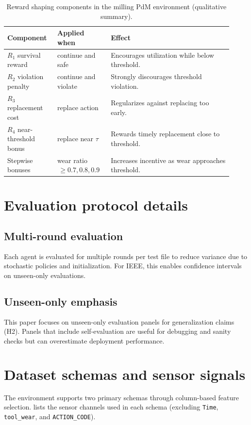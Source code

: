 \documentclass[11pt]{article}
\begin{document}
\begin{table}[t]
	\centering
	\caption{Reward shaping components in the milling PdM environment (qualitative summary).}
	\label{tab:reward_components}
	\begin{tabular}{p{0.20\linewidth} p{0.22\linewidth} p{0.50\linewidth}}
		\toprule
		\rowcolor{gray!20} \textbf{Component} & \textbf{Applied when} & \textbf{Effect}\\
		\midrule
		$R_1$ survival reward & continue and safe & Encourages utilization while below threshold.\\
		$R_2$ violation penalty & continue and violate & Strongly discourages threshold violation.\\
		$R_3$ replacement cost & replace action & Regularizes against replacing too early.\\
		$R_4$ near-threshold bonus & replace near $\tau$ & Rewards timely replacement close to threshold.\\
		Stepwise bonuses & wear ratio $\,\ge 0.7, 0.8, 0.9$ & Increases incentive as wear approaches threshold.\\
		\bottomrule
	\end{tabular}
\end{table}

\section{Evaluation protocol details}
\label{app:eval}
\subsection{Multi-round evaluation}
Each agent is evaluated for multiple rounds per test file to reduce variance due to stochastic policies and initialization. For IEEE, this enables confidence intervals on unseen-only evaluations.

\subsection{Unseen-only emphasis}
This paper focuses on unseen-only evaluation panels for generalization claims (H2). Panels that include self-evaluation are useful for debugging and sanity checks but can overestimate deployment performance.

\section{Dataset schemas and sensor signals}
\label{app:schema}
The environment supports two primary schemas through column-based feature selection.  lists the sensor channels used in each schema (excluding \texttt{Time}, \texttt{tool\_wear}, and \texttt{ACTION\_CODE}).
\end{document}
